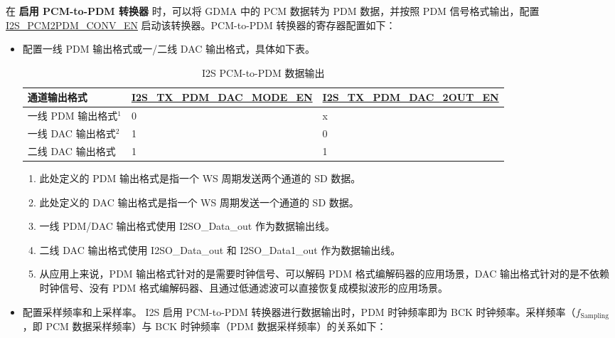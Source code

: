 \documentclass[main\_\_CN.tex]{subfiles}
\begin{document}
在 \textbf{启用 PCM-to-PDM 转换器} 时，可以将 GDMA 中的 PCM 数据转为 PDM 数据，并按照 PDM 信号格式输出，配置 \hyperref[fielddesc:I2SPCM2PDMCONVEN]{I2S\_PCM2PDM\_CONV\_EN} 启动该转换器。PCM-to-PDM 转换器的寄存器配置如下：

\begin{itemize}
    \item 配置一线 PDM 输出格式或一/二线 DAC 输出格式，具体如下表。
\begin{table}[H]
    \centering
    \caption{I2S PCM-to-PDM 数据输出}
    \label{tab:i2s-pcm-pdm-output-mode}
    \begin{tabular}{|p{4.3cm}|R{5.0cm}|R{4.8cm}|}
    \hline
    \textbf{通道输出格式}&\textbf{\hyperref[fielddesc:I2STXPDMDACMODEEN]{I2S\_TX\_PDM\_DAC\_MODE\_EN}} & \textbf{\hyperref[fielddesc:I2STXPDMDAC2OUTEN]{I2S\_TX\_PDM\_DAC\_2OUT\_EN}}\\ \hline
    一线 PDM 输出格式\hyperref[note-1]{$^1$}& 0 & x \\ \hline
    一线 DAC 输出格式\hyperref[note-2]{$^2$} &1   & 0  \\ \hline 
    二线 DAC 输出格式 & 1 & 1 \\ \hline
    \end{tabular}
\end{table}
\vspace{-1em}
\begin{tiplisting}
\vspace{-2em}
\begin{enumerate}
    \item \label{note-1} 此处定义的 PDM 输出格式是指一个 WS 周期发送两个通道的 SD 数据。
    \item \label{note-2} 此处定义的 DAC 输出格式是指一个 WS 周期发送一个通道的 SD 数据。
    \item 一线 PDM/DAC 输出格式使用 I2SO\_Data\_out 作为数据输出线。
    \item 二线 DAC 输出格式使用 I2SO\_Data\_out 和 I2SO\_Data1\_out 作为数据输出线。
    \item 从应用上来说，PDM 输出格式针对的是需要时钟信号、可以解码 PDM 格式编解码器的应用场景，DAC 输出格式针对的是不依赖时钟信号、没有 PDM 格式编解码器、且通过低通滤波可以直接恢复成模拟波形的应用场景。
\end{enumerate}
\end{tiplisting}
\vspace{-1em}

    \item 配置采样频率和上采样率。\newline
    I2S 启用 PCM-to-PDM 转换器进行数据输出时，PDM 时钟频率即为 BCK 时钟频率。采样频率（$f_{\textrm{Sampling}}$，即 PCM 数据采样频率）与 BCK 时钟频率（PDM 数据采样频率）的关系如下：


\end{itemize}
\end{document}
